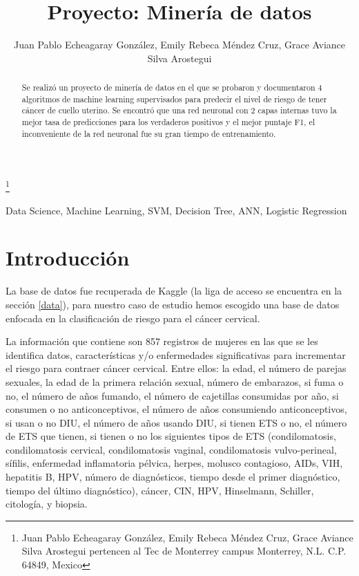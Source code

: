 \documentclass[journal]{IEEEtran}                                                          %
\title{\LARGE \bf Proyecto: Minería de datos}
\author{Juan Pablo Echeagaray González, Emily Rebeca Méndez Cruz, Grace Aviance Silva Arostegui}%
\begin{document}
    \thanks{Juan Pablo Echeagaray González, Emily Rebeca Méndez Cruz, Grace Aviance Silva Arostegui pertencen al Tec de Monterrey campus Monterrey, N.L. C.P. 64849, Mexico {\tt\small}}

    \maketitle

    \thispagestyle{empty}
    \pagestyle{empty}

    \begin{abstract}
        Se realizó un proyecto de minería de datos en el que se probaron y documentaron 4 algoritmos de machine learning supervisados para predecir el nivel de riesgo de tener cáncer de cuello uterino. Se encontró que una red neuronal con 2 capas internas tuvo la mejor tasa de predicciones para los verdaderos positivos y el mejor puntaje F1, el inconveniente de la red neuronal fue su gran tiempo de entrenamiento.
    \end{abstract}

    \begin{IEEEkeywords} 
    Data Science, Machine Learning, SVM, Decision Tree, ANN, Logistic Regression
    \end{IEEEkeywords}

    \section{Introducción} \label{introduction}

        La base de datos fue recuperada de Kaggle (la liga de acceso se encuentra en la sección \ref{data}), para nuestro caso de estudio hemos escogido una base de datos enfocada en la clasificación de riesgo para el cáncer cervical.

        La información que contiene son  857 registros de mujeres en las que se les identifica datos, características y/o enfermedades significativas para incrementar el riesgo para contraer cáncer cervical. Entre ellos: la edad, el número de parejas sexuales, la edad de la primera relación sexual, número de embarazos, si fuma o no, el número de años fumando, el número de cajetillas consumidas por año, si consumen o no anticonceptivos, el número de años consumiendo anticonceptivos, si usan o no DIU, el número de años usando DIU, si tienen ETS o no, el número de ETS que tienen, si tienen o no los siguientes tipos de ETS (condilomatosis, condilomatosis cervical, condilomatosis vaginal, condilomatosis vulvo-perineal, sífilis, enfermedad inflamatoria pélvica, herpes, molusco contagioso, AIDs, VIH, hepatitis B, HPV, número de diagnósticos, tiempo desde el primer diagnóstico, tiempo del último diagnóstico), cáncer, CIN, HPV, Hinselmann, Schiller, citología, y biopsia.
\end{document}

